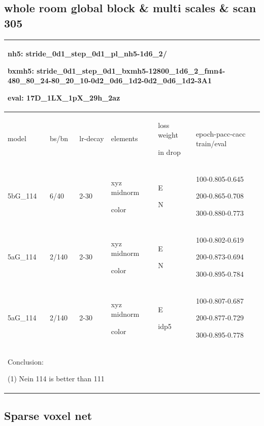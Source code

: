 \documentclass{article}
\begin{document}
\subsection{whole room global block \& multi scales \& scan 305}
\begin{tabular}{|p{1.5cm}|p{1.5cm}|p{1cm}|p{2cm}|p{1.5cm}|p{6cm}| }
	\hline
	\multicolumn{6}{|p{12cm}|}{nh5: stride\_0d1\_step\_0d1\_pl\_nh5-1d6\_2/ \par bxmh5:  stride\_0d1\_step\_0d1\_bxmh5-12800\_1d6\_2\_fmn4-480\_80\_24-80\_20\_10-0d2\_0d6\_1d2-0d2\_0d6\_1d2-3A1 \par eval: 17D\_1LX\_1pX\_29h\_2az } \\
	\hline
	model & bs/bn& lr-decay & elements & loss weight\par in drop & epoch-pacc-cacc train/eval \\
	\hline
	5bG\_114 & 6/40 &2-30 & xyz midnorm\par color& E\par N &100-0.805-0.645\par 200-0.865-0.708 \par 300-0.880-0.773  \\
	\hline
	5aG\_114 & 2/140 &2-30 & xyz midnorm\par color& E\par N &100-0.802-0.619\par 200-0.873-0.694 \par 300-0.895-0.784  \\
	\hline
	5aG\_114 & 2/140 &2-30 & xyz midnorm\par color& E\par idp5 &100-0.807-0.687\par 200-0.877-0.729 \par 300-0.895-0.778  \\
	\hline
	
	\multicolumn{6}{|p{12cm}|}{ Conclusion:\par	(1) Nein 114 is better than 111  } \\
	\hline
\end{tabular}	


\subsection{Sparse voxel net}
\end{document}
